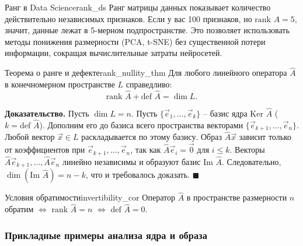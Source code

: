 \documentclass[12pt,a4paper]{article}
\newenvironment{myproof}{\noindent\textbf{Доказательство.}}{\hfill$\blacksquare$}
\begin{document}
\begin{remarkIT}{Ранг в Data Science}{rank_ds}
  Ранг матрицы данных показывает количество действительно независимых
  признаков. Если у вас 100 признаков, но $\text{rank } A = 5$,
  значит, данные лежат в 5-мерном подпространстве. Это позволяет
  использовать методы понижения размерности (PCA, t-SNE) без
  существенной потери информации, сокращая вычислительные затраты нейросетей.
\end{remarkIT}

\begin{theorem}{Теорема о ранге и дефекте}{rank_nullity_thm}
  Для любого линейного оператора $\hat{A}$ в конечномерном
  пространстве $L$ справедливо:
  \[
    \text{rank } \hat{A} + \text{def } \hat{A} = \dim L.
  \]
\end{theorem}

\begin{myproof}
  Пусть $\dim L = n$. Пусть $\{\vec{e}_1, \dots, \vec{e}_k\}$ --
  базис ядра $\text{Ker } \hat{A}$ ($k = \text{def } \hat{A}$).
  Дополним его до базиса всего пространства векторами
  $\{\vec{e}_{k+1}, \dots, \vec{e}_n\}$.
  Любой вектор $\vec{x} \in L$ раскладывается по этому базису. Образ
  $\hat{A}\vec{x}$ зависит только от коэффициентов при
  $\vec{e}_{k+1}, \dots, \vec{e}_n$, так как $\hat{A}\vec{e}_i =
  \vec{0}$ для $i \le k$.
  Векторы $\hat{A}\vec{e}_{k+1}, \dots, \hat{A}\vec{e}_n$ линейно
  независимы и образуют базис $\text{Im } \hat{A}$.
  Следовательно, $\dim(\text{Im } \hat{A}) = n - k$, что и требовалось доказать.
\end{myproof}

\begin{definition}{Условия обратимости}{invertibility_cor}
  Оператор $\hat{A}$ в пространстве размерности $n$ обратим $\iff$
  $\text{rank } \hat{A} = n$ $\iff$ $\text{def } \hat{A} = 0$.
\end{definition}

\subsubsection*{Прикладные примеры анализа ядра и образа}
\end{document}
